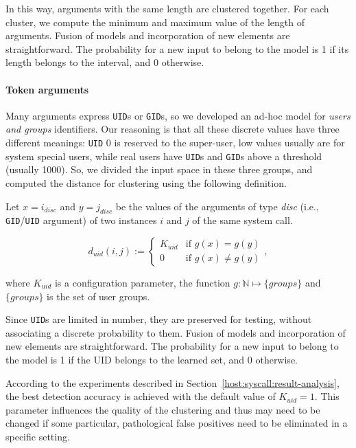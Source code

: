 In this way, arguments with the same length are clustered
together. For each cluster, we compute the minimum and maximum value
of the length of arguments. Fusion of models and incorporation of new
elements are straightforward. The probability for a new input to
belong to the model is 1 if its length belongs to the interval, and 0
otherwise.

\paragraph{Token arguments}
Many arguments express \texttt{UID}s or \texttt{GID}s, so we developed
an ad-hoc model for \emph{users and groups} identifiers. Our reasoning
is that all these discrete values have three different meanings:
\texttt{UID} 0 is reserved to the super-user, low values usually are
for system special users, while real users have \texttt{UID}s and
\texttt{GID}s above a threshold (usually 1000). So, we divided the
input space in these three groups, and computed the distance for
clustering using the following definition.

\begin{definition}
  Let $x = i_{disc}$ and $y = j_{disc}$ be the values of the arguments
  of type \emph{disc} (i.e., \texttt{GID}/\texttt{UID} argument) of
  two instances $i$ and $j$ of the same system call.

\begin{displaymath}
  d_{uid}(i,j) := \left\{
    \begin{array}{lll}
      K_{uid} & \mbox{if $g(x) = g(y)$}\\
      0 & \mbox{if $g(x) \neq g(y)$}
    \end{array}
  \right.,
\end{displaymath}

where $K_{uid}$ is a configuration parameter, the function $g:
\mathbb{N} \mapsto \{groups\}$ and $\{groups\}$ is the set of user
groups.
\end{definition}

Since \texttt{UID}s are limited in number, they are preserved for
testing, without associating a discrete probability to them. Fusion of
models and incorporation of new elements are straightforward. The
probability for a new input to belong to the model is 1 if the UID
belongs to the learned set, and 0 otherwise.

\begin{note}
  According to the experiments described in
  Section~\ref{host:syscall:result-analysis}, the best detection
  accuracy is achieved with the default value of $K_{uid} = 1$. This
  parameter influences the quality of the clustering and thus may need
  to be changed if some particular, pathological false positives need
  to be eliminated in a specific setting.
\end{note}


